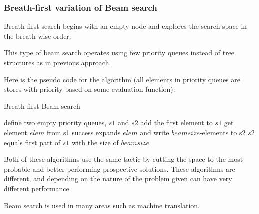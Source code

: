 \subsubsection{Breath-first variation of Beam search}

Breath-first search begins with an empty node and explores the search space in the breath-wise order. 

This type of beam search operates using few priority queues instead of tree structures as in previous approach. 

Here is the pseudo code for the algorithm (all elements in priority queues are stores with priority based on some evaluation function):

\begin{algorithm}
 	\caption{Breath-first Beam search}
	\label{alg:protrack}
	\begin{algorithmic}[1]
		\State define two empty priority queues, $s1$ and $s2$
		\State add the first element to $s1$
				\State get element $elem$ from s1
					\State	success
					\EndIf
					\State expands $elem$ and write $beamsize$-elements to s2
					\EndWhile
					\State $s2$ equals first part of $s1$ with the size of $beamsize$
					\EndWhile
	\end{algorithmic}
\end{algorithm}




\vspace{0.2 cm}
Both of these algorithms use the same tactic by cutting the space to the most probable and better performing prospective solutions. These algorithms are different, and depending on the nature of the problem given can have very different performance.

Beam search is used in many areas such as machine translation.






